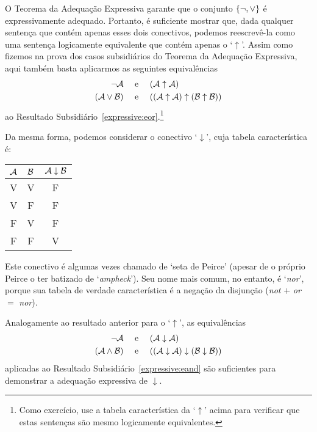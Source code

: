 O Teorema da Adequação Expressiva garante que o conjunto $\{\neg, \vee\}$ é expressivamente adequado.
Portanto, é suficiente mostrar que, dada qualquer sentença que contém apenas esses dois conectivos, podemos reescrevê-la como uma sentença logicamente equivalente que contém apenas o `$\uparrow$'.
Assim como fizemos na prova dos casos subsidiários do Teorema da Adequação Expressiva, aqui também basta aplicarmos as seguintes equivalências
		\begin{align*}
			\neg \mathcal{A} &\text{\quad \ e \quad} (\mathcal{A} \uparrow \mathcal{A})\\
			(\mathcal{A} \vee \mathcal{B}) & \text{\quad \ e \quad} ((\mathcal{A} \uparrow \mathcal{A}) \uparrow (\mathcal{B} \uparrow \mathcal{B}))
		\end{align*}
ao Resultado Subsidiário~\ref{expressive:eor}.\footnote{Como exercício, use a tabela característica da `$\uparrow$' acima para verificar que estas sentenças são mesmo logicamente equivalentes.}

Da mesma forma, podemos considerar o conectivo `$\downarrow$', cuja tabela característica é:
\begin{center}
\begin{tabular}{c c | c}
$\mathcal{A}$ & $\mathcal{B}$ & $\mathcal{A} \mathrel{\downarrow} \mathcal{B}$\\
\hline
 V & V & F \\
 V & F & F  \\
 F & V & F  \\
 F & F & V
\end{tabular}
\end{center}
Este conectivo é algumas vezes chamado de `seta de Peirce' (apesar de o próprio Peirce o ter batizado de `\emph{ampheck}').
Seu nome mais comum, no entanto, é `\emph{nor}', porque sua tabela de verdade característica é a negação da disjunção (\emph{not} $+$ \emph{or} $=$ \emph{nor}).

Analogamente ao resultado anterior para o `$\uparrow$', as equivalências
		\begin{align*}
			\neg \mathcal{A} &\text{\quad \ e \quad} (\mathcal{A} \downarrow \mathcal{A})\\
			(\mathcal{A} \wedge \mathcal{B}) & \text{\quad \ e \quad} ((\mathcal{A} \downarrow \mathcal{A}) \downarrow (\mathcal{B} \downarrow \mathcal{B}))
		\end{align*}
aplicadas ao Resultado Subsidiário~\ref{expressive:eand} são suficientes para demonstrar a adequação expressiva de $\downarrow$.


